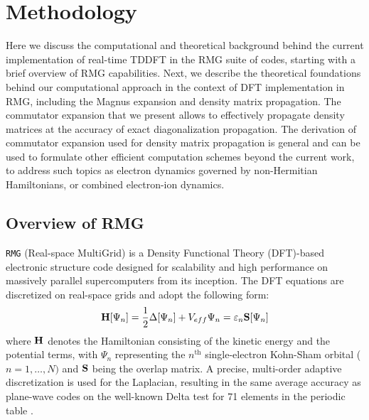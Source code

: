\documentclass[journal=jctcce,manuscript=article,etalmode=truncate,maxauthors=10,layout=twocolumn,9pt]{achemso}   %
\begin{document}
  




\section{Methodology}
\label{sec:methodology}
Here  we discuss  the  computational and  theoretical background behind the current  implementation 
of  real-time TDDFT  in the RMG  suite of codes,
starting with a brief overview of RMG capabilities. 
Next, we describe the theoretical foundations  behind  our computational approach
in the context of  DFT implementation in RMG, including  the Magnus expansion and  density matrix propagation.
The commutator  expansion that we present allows to effectively propagate  density matrices
 at the   accuracy of exact diagonalization propagation.
The  derivation of commutator expansion used for  density matrix propagation is general  and can  be used to formulate
other efficient computation  schemes  beyond the current work, 
to address  such topics as electron dynamics governed by  non-Hermitian Hamiltonians, or combined electron-ion dynamics.




\subsection{ Overview of RMG }

%
\texttt{RMG} (Real-space MultiGrid) is a Density Functional Theory (DFT)-based electronic structure code \cite{briggs1996,rmg-dft-2024} designed for scalability and high performance on massively parallel supercomputers from its inception. The DFT equations \cite{kohn-1964,Kohn-1865} are discretized on real-space grids and adopt the following form: 
\begin{align} 
\vb H[\Psi_n] = \frac{1}{2}\Delta [\Psi_n] +V_{eff}\Psi_n = \varepsilon_n \vb S [\Psi_n] 
\label{eq:DFT}
\end{align}
where $\vb H$ denotes the Hamiltonian consisting of the kinetic energy and the potential terms, with $\Psi_n$  representing the $n^\text{th}$ single-electron Kohn-Sham orbital ($n=1,\ldots,N)$ and $\vb S$ being the overlap matrix. A precise, multi-order adaptive discretization is used for the Laplacian, resulting in the same average accuracy as plane-wave codes on the well-known Delta test for 71 elements in the periodic table \cite{rmg-dft-2024,DFT-reproducibility}. 
\end{document}
